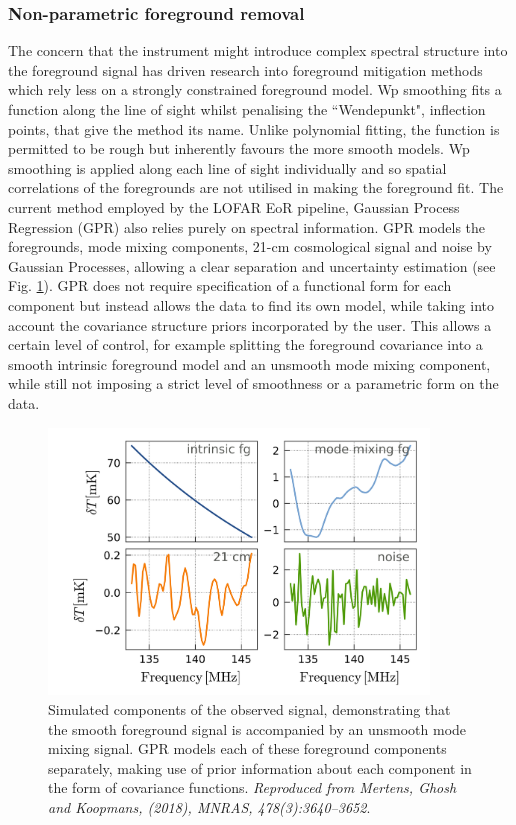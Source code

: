 \subsubsection{Non-parametric foreground removal}
\label{sec:nonpar}
The concern that the instrument might introduce complex spectral structure into the foreground signal has driven research into foreground mitigation methods which rely less on a strongly constrained foreground model. Wp smoothing \cite{Harker2009MNRAS.397.1138H} fits a function along the line of sight whilst penalising the ``Wendepunkt", inflection points, that give the method its name. Unlike polynomial fitting, the function is permitted to be rough but inherently favours the more smooth models. Wp smoothing is applied along each line of sight individually and so spatial correlations of the foregrounds are not utilised in making the foreground fit. The current method employed by the LOFAR EoR pipeline, Gaussian Process Regression (GPR) \cite{Mertens2018MNRAS.478.3640M} also relies purely on spectral information. GPR models the foregrounds, mode mixing components, 21-cm cosmological signal and noise by Gaussian Processes, allowing a clear separation and uncertainty estimation (see Fig. \ref{fig:mertens_comp}). GPR does not require specification of a functional form for each component but instead allows the data to find its own model, while taking into account the covariance structure priors incorporated by the user. This allows a certain level of control, for example splitting the foreground covariance into a smooth intrinsic foreground model and an unsmooth mode mixing component, while still not imposing a strict level of smoothness or a parametric form on the data. 

\begin{figure}
\begin{center}
    \includegraphics[width=0.9\textwidth]{Chapman_Jelic/Images/mertens_components.png}
\end{center}
    \caption{Simulated components of the observed signal, demonstrating that the smooth foreground signal is accompanied by an unsmooth mode mixing signal. GPR models each of these foreground components separately, making use of prior information about each component in the form of covariance functions. \textit{Reproduced from Mertens, Ghosh and Koopmans, (2018), MNRAS, 478(3):3640--3652}.}
    \label{fig:mertens_comp}
\end{figure}

